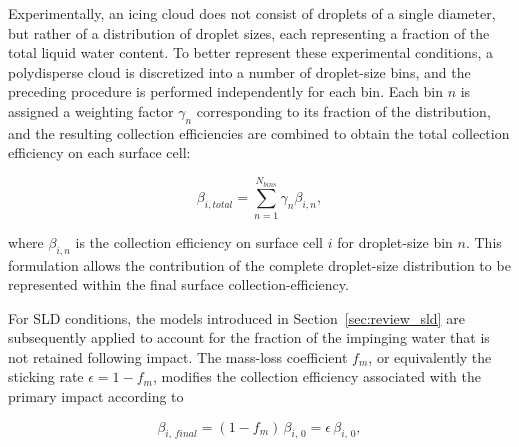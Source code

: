 
Experimentally, an icing cloud does not consist of droplets of a single diameter, but rather of a distribution of droplet sizes, each representing a fraction of the total liquid water content. To better represent these experimental conditions, a polydisperse cloud is discretized into a number of droplet-size bins, and the preceding procedure is performed independently for each bin. Each bin $n$ is assigned a weighting factor $\gamma_n$ corresponding to its fraction of the distribution, and the resulting collection efficiencies are combined to obtain the total collection efficiency on each surface cell:

\begin{equation}
    \beta_{i,total} = \sum_{n=1}^{N_{bins}} \gamma_n \beta_{i,n},
    \label{eq:betaTotal}
\end{equation}

\noindent where $\beta_{i,n}$ is the collection efficiency on surface cell $i$ for droplet-size bin $n$. This formulation allows the contribution of the complete droplet-size distribution to be represented within the final surface collection-efficiency.

For SLD conditions, the models introduced in Section~\ref{sec:review_sld} are subsequently applied to account for the fraction of the impinging water that is not retained following impact. The mass-loss coefficient $f_m$, or equivalently the sticking rate $\epsilon=1-f_m$, modifies the collection efficiency associated with the primary impact according to

\begin{equation}
    \beta_{i,\,final} = (1-f_m)\,\beta_{i,\,0}
    = \epsilon\,\beta_{i,\,0},
\end{equation}

